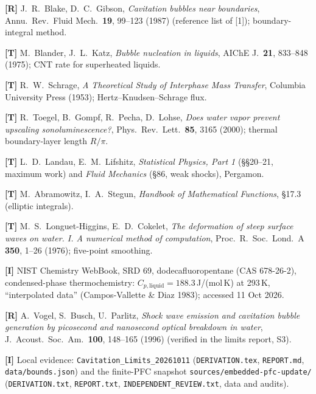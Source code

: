 \begin{enumerate}[leftmargin=*,itemsep=1pt,label={[\arabic*]}]
\item \textbf{[R]} J.~R.~Blake, D.~C.~Gibson, \emph{Cavitation bubbles near boundaries}, Annu.\ Rev.\ Fluid Mech.\ \textbf{19}, 99--123
(1987) (reference list of [1]); boundary-integral method.
\item \textbf{[T]} M.~Blander, J.~L.~Katz, \emph{Bubble nucleation in liquids}, AIChE J.\ \textbf{21}, 833--848 (1975); CNT rate
for superheated liquids.
\item \textbf{[T]} R.~W.~Schrage, \emph{A Theoretical Study of Interphase Mass Transfer}, Columbia University Press (1953);
Hertz--Knudsen--Schrage flux.
\item \textbf{[T]} R.~Toegel, B.~Gompf, R.~Pecha, D.~Lohse, \emph{Does water vapor prevent upscaling sonoluminescence?}, Phys.\ Rev.\
Lett.\ \textbf{85}, 3165 (2000); thermal boundary-layer length $R/\pi$.
\item \textbf{[T]} L.~D.~Landau, E.~M.~Lifshitz, \emph{Statistical Physics, Part 1} (\S\S20--21, maximum work) and \emph{Fluid
Mechanics} (\S86, weak shocks), Pergamon.
\item \textbf{[T]} M.~Abramowitz, I.~A.~Stegun, \emph{Handbook of Mathematical Functions}, \S17.3 (elliptic integrals).
\item \textbf{[T]} M.~S.~Longuet-Higgins, E.~D.~Cokelet, \emph{The deformation of steep surface waves on water. I. A numerical method
of computation}, Proc.\ R.\ Soc.\ Lond.\ A \textbf{350}, 1--26 (1976); five-point smoothing.
\item \textbf{[I]} NIST Chemistry WebBook, SRD 69, dodecafluoropentane (CAS 678-26-2), condensed-phase thermochemistry:
$C_{p,\mathrm{liquid}}=188.3$\,J/(mol\,K) at 293\,K, ``interpolated data'' (Campos-Vallette \& Diaz 1983); accessed 11 Oct 2026.
\item \textbf{[R]} A.~Vogel, S.~Busch, U.~Parlitz, \emph{Shock wave emission and cavitation bubble generation by picosecond and
nanosecond optical breakdown in water}, J.\ Acoust.\ Soc.\ Am.\ \textbf{100}, 148--165 (1996) (verified in the limits report, S3).
\item \textbf{[I]} Local evidence: \texttt{Cavitation\_Limits\_20261011} (\texttt{DERIVATION.tex}, \texttt{REPORT.md},
\texttt{data/bounds.json}) and the finite-PFC snapshot \texttt{sources/embedded-pfc-update/} (\texttt{DERIVATION.txt},
\texttt{REPORT.txt}, \texttt{INDEPENDENT\_REVIEW.txt}, data and audits).
\end{enumerate}
